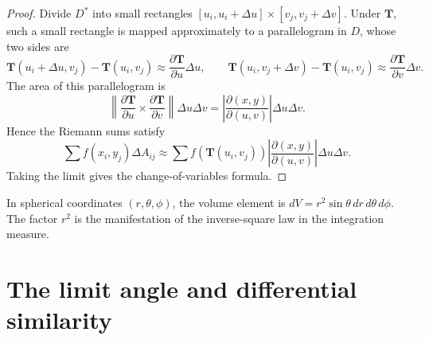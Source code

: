\begin{proof}
Divide $D^*$ into small rectangles $[u_i, u_i+\Delta u] \times [v_j, v_j+\Delta v]$. Under $\mathbf{T}$, such a small rectangle is mapped approximately to a parallelogram in $D$, whose two sides are
\[
\mathbf{T}(u_i+\Delta u, v_j) - \mathbf{T}(u_i, v_j) \approx \frac{\partial \mathbf{T}}{\partial u}\Delta u, \qquad
\mathbf{T}(u_i, v_j+\Delta v) - \mathbf{T}(u_i, v_j) \approx \frac{\partial \mathbf{T}}{\partial v}\Delta v.
\]
The area of this parallelogram is
\[
\left\|\frac{\partial \mathbf{T}}{\partial u} \times \frac{\partial \mathbf{T}}{\partial v}\right\| \Delta u \Delta v = \left|\frac{\partial(x,y)}{\partial(u,v)}\right| \Delta u \Delta v.
\]
Hence the Riemann sums satisfy
\[
\sum f(x_i, y_j)\Delta A_{ij} \approx \sum f(\mathbf{T}(u_i, v_j)) \left|\frac{\partial(x,y)}{\partial(u,v)}\right| \Delta u \Delta v.
\]
Taking the limit gives the change-of-variables formula.
\end{proof}

\begin{example}\label{ex:spherical_coordinates}
In spherical coordinates $(r, \theta, \phi)$, the volume element is $dV = r^2 \sin\theta \, dr\, d\theta\, d\phi$. The factor $r^2$ is the manifestation of the inverse-square law in the integration measure.
\end{example}

\section{\texorpdfstring{The limit angle and differential similarity}{The limit angle and differential similarity}}

